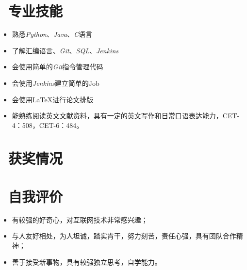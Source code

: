 \documentclass{resume}
\begin{document}
\section{\faCogs\ 专业技能}
\begin{itemize}[parsep=1ex]
  \item 熟悉\emph{Python}、\emph{Java}、\emph{C}语言
  \item 了解汇编语言、\emph{Git}、\emph{SQL}、\emph{Jenkins}
  \item 会使用简单的\emph{Git}指令管理代码
  \item 会使用\emph{Jenkins}建立简单的Job
  \item 会使用\LaTeX 进行论文排版 
  \item 能熟练阅读英文文献资料，具有一定的英文写作和日常口语表达能力，CET-4：508，CET-6：484。

\end{itemize}

\section{\faHeartO\ 获奖情况}
\begin{itemize}[parsep=0.5ex]

\end{itemize}

\section{\faInfo\ 自我评价}
\begin{itemize}[parsep=0.5ex]
  \item 有较强的好奇心，对互联网技术非常感兴趣；
  \item 与人友好相处，为人坦诚，踏实肯干，努力刻苦，责任心强，具有团队合作精神；
  \item 善于接受新事物，具有较强独立思考，自学能力。
\end{itemize}

%
%
\end{document}
